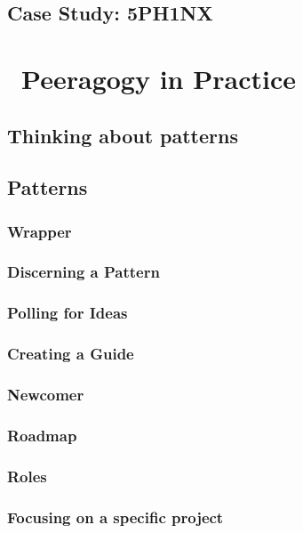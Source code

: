 \documentclass[ebook, 12pt, twoside]{memoir}
\begin{document}
\chapter[\textbf{Case Study: 5PH1NX}]{Case Study: 5PH1NX}\label{sphinx-beginning}
%


\part{~Peeragogy in Practice} \label{practice-part}  %
%
\chapter[\textbf{Thinking about patterns}]{Thinking about patterns}

%
\chapter[\textbf{Patterns}]{ Patterns } 

\section*{Wrapper}

\section*{Discerning a Pattern}

\section*{Polling for Ideas}

\section*{Creating a Guide}

\section*{Newcomer}

\section*{Roadmap}

\section*{Roles}

\section*{Focusing on a specific project}

\end{document}
